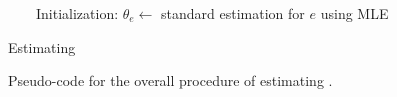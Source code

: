 \begin{figure}[!t]
\centering
\begin{algorithm}[H!]
 \begin{algorithmic}[1]
 \Statex ~~~~Initialization: \vspace{2pt}
 \State $\theta_e \gets$ standard estimation for $e$ using MLE
 \EndFor
 \Repeat
 \State {}
 \State {} 
 \EndProcedure
 \end{algorithmic}
 \caption{Estimating \HSWLM}
\end{algorithm}
\caption{\label{alg:hswlm}Pseudo-code for the overall procedure of estimating \achswlm.}
\end{figure}